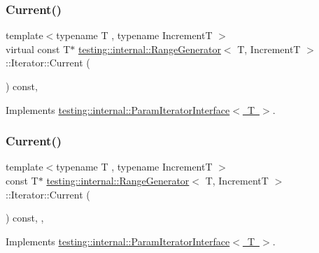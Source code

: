 \subsubsection{\texorpdfstring{Current()}{Current()}\hspace{0.1cm}{\footnotesize\ttfamily [1/3]}}
{\footnotesize\ttfamily template$<$typename T , typename IncrementT $>$ \\
virtual const T$\ast$ \mbox{\hyperlink{classtesting_1_1internal_1_1_range_generator}{testing\+::internal\+::\+Range\+Generator}}$<$ T, IncrementT $>$\+::Iterator\+::\+Current (\begin{DoxyParamCaption}{ }\end{DoxyParamCaption}) const\hspace{0.3cm}{\ttfamily [inline]}, {\ttfamily [virtual]}}



Implements \mbox{\hyperlink{classtesting_1_1internal_1_1_param_iterator_interface_adfff808576d929085679c315b255af7e}{testing\+::internal\+::\+Param\+Iterator\+Interface$<$ T $>$}}.

\mbox{\label{classtesting_1_1internal_1_1_range_generator_1_1_iterator_acbdfc5919d37fb9514914afb041e50ff}} 
\subsubsection{\texorpdfstring{Current()}{Current()}\hspace{0.1cm}{\footnotesize\ttfamily [2/3]}}
{\footnotesize\ttfamily template$<$typename T , typename IncrementT $>$ \\
const T$\ast$ \mbox{\hyperlink{classtesting_1_1internal_1_1_range_generator}{testing\+::internal\+::\+Range\+Generator}}$<$ T, IncrementT $>$\+::Iterator\+::\+Current (\begin{DoxyParamCaption}{ }\end{DoxyParamCaption}) const\hspace{0.3cm}{\ttfamily [inline]}, {\ttfamily [override]}, {\ttfamily [virtual]}}



Implements \mbox{\hyperlink{classtesting_1_1internal_1_1_param_iterator_interface_adfff808576d929085679c315b255af7e}{testing\+::internal\+::\+Param\+Iterator\+Interface$<$ T $>$}}.

